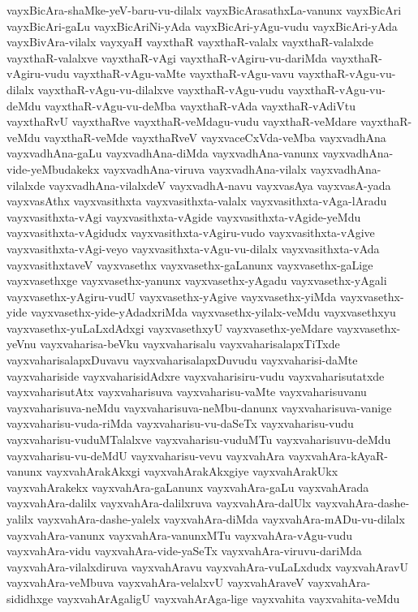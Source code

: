 {vayxBicAra-shaMke-yeV-baru-vu-dilalx
vayxBicArasathxLa-vanunx
vayxBicAri
vayxBicAri-gaLu
vayxBicAriNi-yAda
vayxBicAri-yAgu-vudu
vayxBicAri-yAda
vayxBivAra-vilalx
vayxyaH
vayxthaR
vayxthaR-valalx
vayxthaR-valalxde
vayxthaR-valalxve
vayxthaR-vAgi
vayxthaR-vAgiru-vu-dariMda
vayxthaR-vAgiru-vudu
vayxthaR-vAgu-vaMte
vayxthaR-vAgu-vavu
vayxthaR-vAgu-vu-dilalx
vayxthaR-vAgu-vu-dilalxve
vayxthaR-vAgu-vudu
vayxthaR-vAgu-vu-deMdu
vayxthaR-vAgu-vu-deMba
vayxthaR-vAda
vayxthaR-vAdiVtu
vayxthaRvU
vayxthaRve
vayxthaR-veMdagu-vudu
vayxthaR-veMdare
vayxthaR-veMdu
vayxthaR-veMde
vayxthaRveV
vayxvaceCxVda-veMba
vayxvadhAna
vayxvadhAna-gaLu
vayxvadhAna-diMda
vayxvadhAna-vanunx
vayxvadhAna-vide-yeMbudakekx
vayxvadhAna-viruva
vayxvadhAna-vilalx
vayxvadhAna-vilalxde
vayxvadhAna-vilalxdeV
vayxvadhA-navu
vayxvasAya
vayxvasA-yada
vayxvasAthx
vayxvasithxta
vayxvasithxta-valalx
vayxvasithxta-vAga-lAradu
vayxvasithxta-vAgi
vayxvasithxta-vAgide
vayxvasithxta-vAgide-yeMdu
vayxvasithxta-vAgidudx
vayxvasithxta-vAgiru-vudo
vayxvasithxta-vAgive
vayxvasithxta-vAgi-veyo
vayxvasithxta-vAgu-vu-dilalx
vayxvasithxta-vAda
vayxvasithxtaveV
vayxvasethx
vayxvasethx-gaLanunx
vayxvasethx-gaLige
vayxvasethxge
vayxvasethx-yanunx
vayxvasethx-yAgadu
vayxvasethx-yAgali
vayxvasethx-yAgiru-vudU
vayxvasethx-yAgive
vayxvasethx-yiMda
vayxvasethx-yide
vayxvasethx-yide-yAdadxriMda
vayxvasethx-yilalx-veMdu
vayxvasethxyu
vayxvasethx-yuLaLxdAdxgi
vayxvasethxyU
vayxvasethx-yeMdare
vayxvasethx-yeVnu
vayxvaharisa-beVku
vayxvaharisalu
vayxvaharisalapxTiTxde
vayxvaharisalapxDuvavu
vayxvaharisalapxDuvudu
vayxvaharisi-daMte
vayxvahariside
vayxvaharisidAdxre
vayxvaharisiru-vudu
vayxvaharisutatxde
vayxvaharisutAtx
vayxvaharisuva
vayxvaharisu-vaMte
vayxvaharisuvanu
vayxvaharisuva-neMdu
vayxvaharisuva-neMbu-danunx
vayxvaharisuva-vanige
vayxvaharisu-vuda-riMda
vayxvaharisu-vu-daSeTx
vayxvaharisu-vudu
vayxvaharisu-vuduMTalalxve
vayxvaharisu-vuduMTu
vayxvaharisuvu-deMdu
vayxvaharisu-vu-deMdU
vayxvaharisu-vevu
vayxvahAra
vayxvahAra-kAyaR-vanunx
vayxvahArakAkxgi
vayxvahArakAkxgiye
vayxvahArakUkx
vayxvahArakekx
vayxvahAra-gaLanunx
vayxvahAra-gaLu
vayxvahArada
vayxvahAra-dalilx
vayxvahAra-dalilxruva
vayxvahAra-dalUlx
vayxvahAra-dashe-yalilx
vayxvahAra-dashe-yalelx
vayxvahAra-diMda
vayxvahAra-mADu-vu-dilalx
vayxvahAra-vanunx
vayxvahAra-vanunxMTu
vayxvahAra-vAgu-vudu
vayxvahAra-vidu
vayxvahAra-vide-yaSeTx
vayxvahAra-viruvu-dariMda
vayxvahAra-vilalxdiruva
vayxvahAravu
vayxvahAra-vuLaLxdudx
vayxvahAravU
vayxvahAra-veMbuva
vayxvahAra-velalxvU
vayxvahAraveV
vayxvahAra-sididhxge
vayxvahArAgaligU
vayxvahArAga-lige
vayxvahita
vayxvahita-veMdu
}
